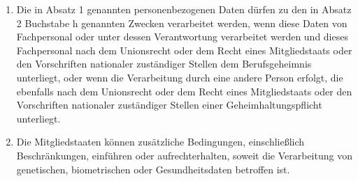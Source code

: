 \begin{enumerate}
\begin{enumerate}[label=\alph*)]
                \end{enumerate}
            \item Die in Absatz 1 genannten personenbezogenen Daten dürfen zu den in Absatz 2 Buchstabe h genannten Zwecken verarbeitet werden, wenn diese Daten von Fachpersonal oder unter dessen Verantwortung verarbeitet werden und dieses Fachpersonal nach dem Unionsrecht oder dem Recht eines Mitgliedstaats oder den Vorschriften nationaler zuständiger Stellen dem Berufsgeheimnis unterliegt, oder wenn die Verarbeitung durch eine andere Person erfolgt, die ebenfalls nach dem Unionsrecht oder dem Recht eines Mitgliedstaats oder den Vorschriften nationaler zuständiger Stellen einer Geheimhaltungspflicht unterliegt.
            \item Die Mitgliedstaaten können zusätzliche Bedingungen, einschließlich Be\-schrän\-kun\-gen, einführen oder aufrechterhalten, soweit die Verarbeitung von genetischen, biometrischen oder Gesundheitsdaten betroffen ist. 
        \end{enumerate}
